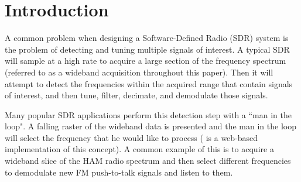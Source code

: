 \documentclass[12pt]{article}
\begin{document}
\vfill



\pagebreak

%
%

\tableofcontents
\pagebreak

\listoffigures
\pagebreak


\pagestyle{myheadings}

\section{Introduction}
\label{sec:intro}

A common problem when designing a Software-Defined Radio (SDR) system is the
problem of detecting and tuning multiple signals of interest. A typical SDR will sample
at a high rate to acquire a large section of the frequency spectrum (referred
to as a wideband acquisition throughout this paper). Then it will attempt to
detect the frequencies within the acquired range that contain signals of
interest, and then tune, filter, decimate, and demodulate those signals. 

Many popular SDR applications perform this detection step with a ``man in the
loop".  A falling raster of the wideband data is presented and the man in the
loop will select the frequency that he would like to process (\cite{WebSDR}
is a web-based implementation of this concept).  A common example of this is to
acquire a wideband slice of the HAM radio spectrum and then select different
frequencies to demodulate new FM push-to-talk signals and listen to them.
\end{document}
